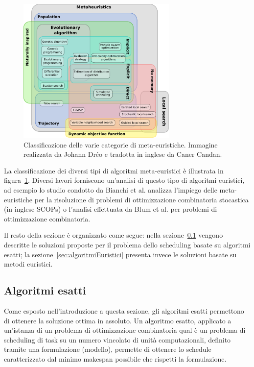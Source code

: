 \begin{figure}[t!]
 \begin{center}
  \includegraphics[width=0.7\textwidth]
  {capitoli/figure/cap3/MetaheuristicsClassification.pdf}
  \caption[Classificazione degli algoritmi meta-euristici]{Classificazione delle
  varie categorie di meta-euristiche. Immagine 
realizzata da Johann Dréo \cite{MetaheuristicsClassifications} e tradotta in inglese da Caner Candan.}
\label{fig:metaheuristicsClassification}
 \end{center}
\end{figure}


La classificazione dei diversi tipi di algoritmi meta-euristici è illustrata in 
figura~\ref{fig:metaheuristicsClassification}. Diversi lavori forniscono 
un'analisi di questo tipo di algoritmi euristici, ad esempio lo studio condotto 
da Bianchi et al. \cite{SurveyMetaheuristicSCOP} analizza l'impiego delle 
meta-euristiche per la risoluzione di problemi di ottimizzazione combinatoria stocastica
(in inglese \aclp{SCOP}) o l'analisi effettuata da Blum 
et al. \cite{MetaheuristicCombinatorialOptimization} per problemi di 
ottimizzazione combinatoria.

Il resto della sezione è organizzato come segue: nella
sezione~\ref{sec:algoritmiEsatti} vengono descritte le soluzioni proposte per il 
problema dello scheduling basate su algoritmi esatti; la
sezione~\ref{sec:algoritmiEuristici} presenta invece le soluzioni basate su metodi 
euristici.


\subsection{Algoritmi esatti}
\label{sec:algoritmiEsatti}
Come esposto nell'introduzione a questa sezione, gli algoritmi esatti 
permettono di ottenere la soluzione ottima in assoluto. Un algoritmo esatto, 
applicato a un'istanza di un problema di ottimizzazione combinatoria qual è un
problema di scheduling di task su un numero vincolato di unit\`a computazionali,
definito tramite una formulazione (modello), permette di ottenere lo schedule
caratterizzato dal minimo makespan possibile che rispetti la formulazione. 

